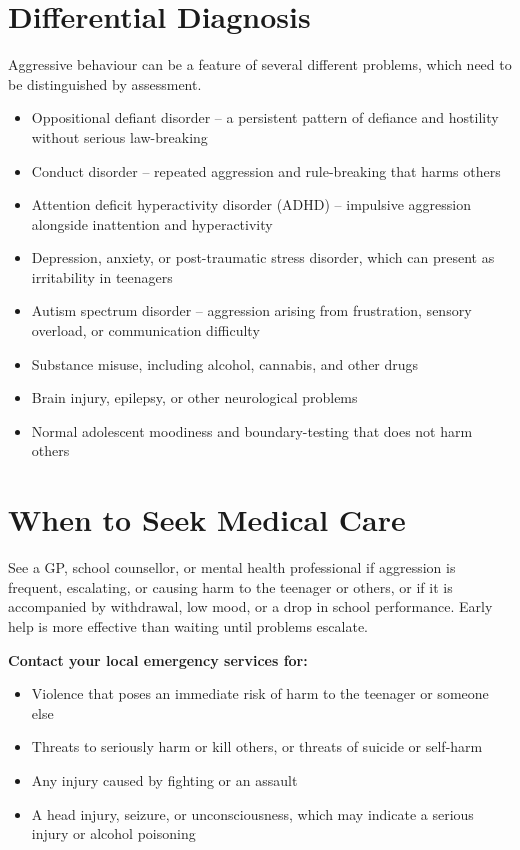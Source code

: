 \section*{Differential Diagnosis}
Aggressive behaviour can be a feature of several different problems, which need to be distinguished by assessment.

\begin{itemize}
    \item Oppositional defiant disorder -- a persistent pattern of defiance and hostility without serious law-breaking
    \item Conduct disorder -- repeated aggression and rule-breaking that harms others
    \item Attention deficit hyperactivity disorder (ADHD) -- impulsive aggression alongside inattention and hyperactivity
    \item Depression, anxiety, or post-traumatic stress disorder, which can present as irritability in teenagers
    \item Autism spectrum disorder -- aggression arising from frustration, sensory overload, or communication difficulty
    \item Substance misuse, including alcohol, cannabis, and other drugs
    \item Brain injury, epilepsy, or other neurological problems
    \item Normal adolescent moodiness and boundary-testing that does not harm others
\end{itemize}

\section*{When to Seek Medical Care}
See a GP, school counsellor, or mental health professional if aggression is frequent, escalating, or causing harm to the teenager or others, or if it is accompanied by withdrawal, low mood, or a drop in school performance. Early help is more effective than waiting until problems escalate.

\textbf{Contact your local emergency services for:}
\begin{itemize}
    \item Violence that poses an immediate risk of harm to the teenager or someone else
    \item Threats to seriously harm or kill others, or threats of suicide or self-harm
    \item Any injury caused by fighting or an assault
    \item A head injury, seizure, or unconsciousness, which may indicate a serious injury or alcohol poisoning
\end{itemize}

